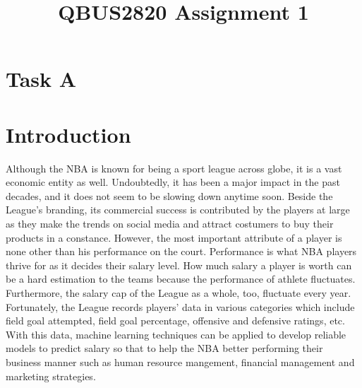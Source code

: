 \documentclass[letterpaper,12pt,twoside,]{pinp}
\title{QBUS2820 Assignment 1}
\author[]{}
\begin{document}
\verticaladjustment{-2pt}

\maketitle
\thispagestyle{firststyle}




\hypertarget{task-a}{%
\section{Task A}\label{task-a}}

\hypertarget{introduction}{%
\section{Introduction}\label{introduction}}

Although the NBA is known for being a sport league across globe, it is a
vast economic entity as well. Undoubtedly, it has been a major impact in
the past decades, and it does not seem to be slowing down anytime soon.
Beside the League's branding, its commercial success is contributed by
the players at large as they make the trends on social media and attract
costumers to buy their products in a constance. However, the most
important attribute of a player is none other than his performance on
the court. Performance is what NBA players thrive for as it decides
their salary level. How much salary a player is worth can be a hard
estimation to the teams because the performance of athlete fluctuates.
Furthermore, the salary cap of the League as a whole, too, fluctuate
every year. Fortunately, the League records players' data in various
categories which include field goal attempted, field goal percentage,
offensive and defensive ratings, etc. With this data, machine learning
techniques can be applied to develop reliable models to predict salary
so that to help the NBA better performing their business manner such as
human resource mangement, financial management and marketing strategies.
\end{document}
